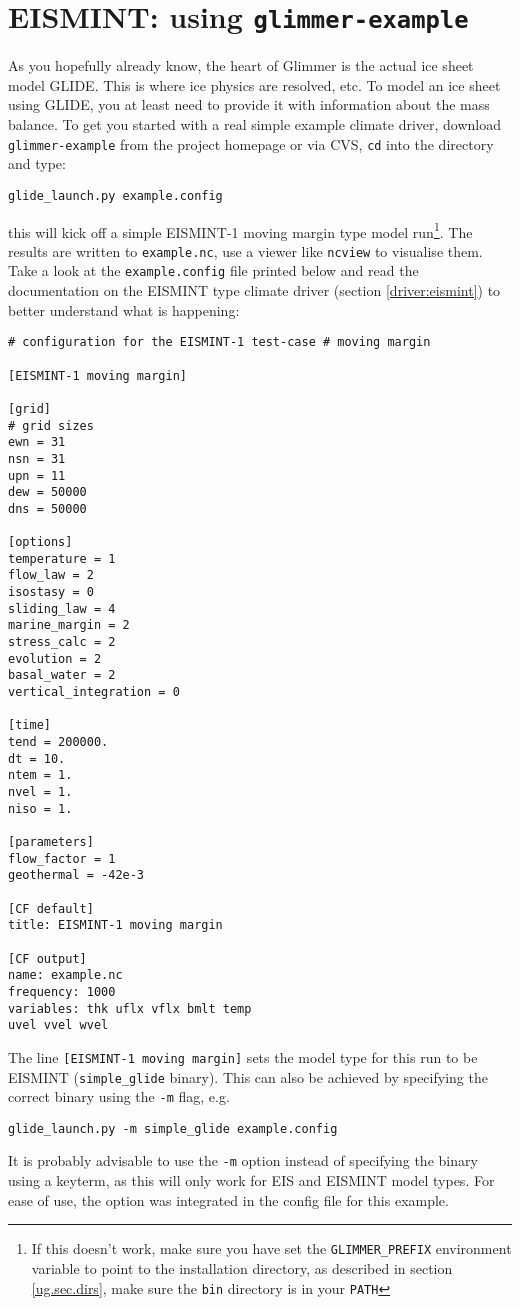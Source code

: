 
\section{EISMINT: using \texttt{glimmer-example}}
As you hopefully already know, the heart of Glimmer is the actual ice sheet model
GLIDE. This is where ice physics are resolved, etc. To model an ice sheet using
GLIDE, you at least need to provide it with information about the 
mass balance. To get you started with a real simple example climate driver,
download \texttt{glimmer-example} from the project homepage or via CVS, \texttt{cd} into
the directory and type:
\begin{verbatim}
glide_launch.py example.config
\end{verbatim}
this will kick off a simple EISMINT-1 moving margin type model
run\footnote{If this doesn't work, make sure you have set the
  \texttt{GLIMMER\_PREFIX} environment variable to point to the
  installation directory, as described in section \ref{ug.sec.dirs},
  make sure the \texttt{bin} directory is in your \texttt{PATH}}. The results
are written to \texttt{example.nc}, use a viewer like \texttt{ncview} to visualise them.
Take a look at the \texttt{example.config} file printed below and read the documentation on
the EISMINT type climate driver (section \ref{driver:eismint}) to better understand what is happening:\\

\begin{verbatim}
# configuration for the EISMINT-1 test-case # moving margin

[EISMINT-1 moving margin]

[grid]
# grid sizes
ewn = 31
nsn = 31
upn = 11
dew = 50000
dns = 50000

[options]
temperature = 1
flow_law = 2
isostasy = 0
sliding_law = 4
marine_margin = 2
stress_calc = 2
evolution = 2
basal_water = 2
vertical_integration = 0

[time]
tend = 200000.
dt = 10.
ntem = 1.
nvel = 1.
niso = 1.

[parameters]
flow_factor = 1
geothermal = -42e-3

[CF default]
title: EISMINT-1 moving margin

[CF output]
name: example.nc
frequency: 1000
variables: thk uflx vflx bmlt temp
uvel vvel wvel
\end{verbatim}

The line \texttt{[EISMINT-1 moving margin]} sets the model type for this run to be EISMINT (\texttt{simple\_glide} binary).
This can also be achieved by specifying the correct binary using the \texttt{-m} flag, e.g.
\begin{verbatim}
glide_launch.py -m simple_glide example.config
\end{verbatim}
It is probably advisable to use the \texttt{-m} option instead of specifying the binary using a 
keyterm, as this will only work for EIS and EISMINT model types. For ease of use, the option was integrated
in the config file for this example. 

